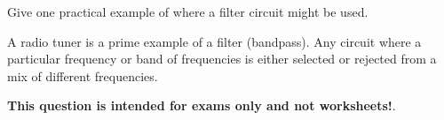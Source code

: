 

Give one practical example of where a filter circuit might be used.

\vskip 30pt







A radio tuner is a prime example of a filter (bandpass).  Any circuit where a particular frequency or band of frequencies is either selected or rejected from a mix of different frequencies.







{\bf This question is intended for exams only and not worksheets!}.



